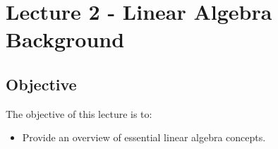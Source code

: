 \chapter{Lecture 2 - Linear Algebra Background}
\label{ch:lec2n}
\section{Objective}
The objective of this lecture is to:
\begin{itemize}
\item Provide an overview of essential linear algebra concepts.
\end{itemize}
\setcounter{lstannotation}{0}

